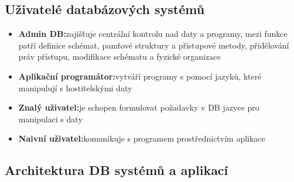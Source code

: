 \documentclass[a4paper,10pt]{article}
\newcommand{\pojem}[2]{\item \textbf{#1:}\quad #2}
\begin{document}
			\subsection{Uživatelé databázových systémů}
				\begin{itemize}
					\pojem{Admin DB}{zajišťuje centrální kontrolu nad daty a programy, mezi funkce patří definice schémat, pamťové struktury a přístupové metody, přidělování práv přístupu, modifikace schématu a fyzické organizace}
					\pojem{Aplikační programátor}{vytváří programy s pomocí jazyků, které manipulují s hostitelskými daty}
					\pojem{Znalý uživatel}{je schopen formulovat požadavky v DB jazyce pro manipulaci s daty}
					\pojem{Naivní uživatel}{komunikuje s programem prostřednictvím aplikace}
				\end{itemize}

			\subsection{Architektura DB systémů a aplikací}
\end{document}
